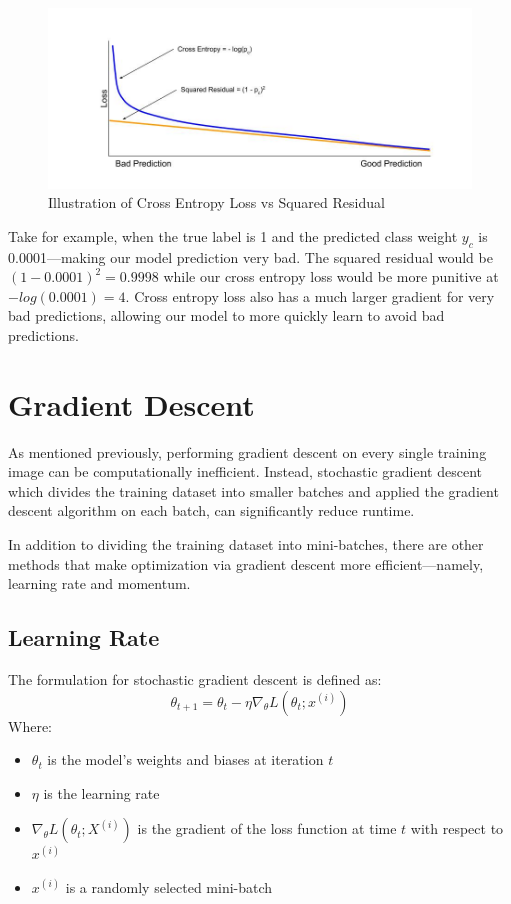 \documentclass [MS] {uclathes}
\begin{document}
\begin{figure}[H]
    \centering
    \includegraphics[width=1\linewidth]{figures/CE vs Square Residual.jpg}
    \caption{Illustration of Cross Entropy Loss vs Squared Residual}
    \label{fig:enter-label}
\end{figure}

Take for example, when the true label is 1 and the predicted class weight \(y_{c}\) is 0.0001---making our model 
prediction very bad. The squared residual would be \((1-0.0001)^{2} = 0.9998\) while our cross entropy loss would be 
more punitive at \(-log(0.0001) = 4\). Cross entropy loss also has a much larger gradient for very bad predictions, 
allowing our model to more quickly learn to avoid bad predictions.

\section{Gradient Descent}
As mentioned previously, performing gradient descent on every single training image can be computationally inefficient. 
Instead, stochastic gradient descent which divides the training dataset into smaller batches and applied the gradient 
descent algorithm on each batch, can significantly reduce runtime. 

In addition to dividing the training dataset into mini-batches, there are other methods that make optimization via 
gradient descent more efficient---namely, learning rate and momentum.

\subsection{Learning Rate}
The formulation for stochastic gradient descent is defined as:
\[\theta_{t+1} = \theta_{t} - \eta\nabla_{\theta}L(\theta_{t};x^{(i)})\]
Where:
\begin{itemize}
    \item \(\theta_{t}\) is the model's weights and biases at iteration \(t\)
    \item \(\eta\) is the learning rate
    \item \(\nabla_{\theta}L(\theta_{t};X^{(i)})\) is the gradient of the loss function at time \(t\) with respect to 
    \(x^{(i)}\)
    \item \(x^{(i)}\) is a randomly selected mini-batch
\end{itemize}
\end{document}
